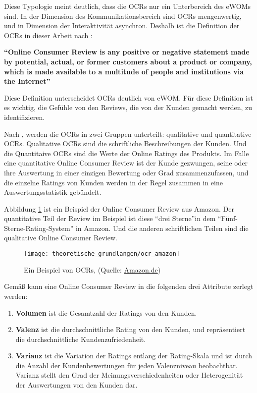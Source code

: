 Diese Typologie meint deutlich, dass die \ac{OCRs} nur ein Unterbereich des \ac{eWOM}s sind. In der Dimension des Kommunikationsbereich sind \ac{OCRs} mengenwertig, und in Dimension der Interaktivität asynchron. Deshalb ist die Definition der \ac{OCRs} in dieser Arbeit nach \citet{Hennig-Thurau2004a}:

\textbf{``Online Consumer Review is any positive or negative statement made by potential, actual, or former customers about a product or company, which is made available to a multitude of people and institutions via the Internet''}

Diese Definition unterscheidet \acl{OCRs} deutlich von \ac{eWOM}. Für diese Definition ist es wichtig, die Gefühle von den Reviews, die von der Kunden gemacht werden, zu identifizieren. 

Nach \citet{Shrihari2012}, werden die \ac{OCRs} in zwei Gruppen unterteilt: qualitative und quantitative \ac{OCRs}. Qualitative \ac{OCRs} sind die schriftliche Beschreibungen der Kunden. Und die Quantitaive \ac{OCRs} sind die Werte der Online Ratings des Produkts. Im Falle eine quantitative Online Consumer Review ist der Kunde gezwungen, seine oder ihre Auswertung in einer einzigen Bewertung oder Grad zusammenzufassen, und die einzelne Ratings von Kunden werden in der Regel zusammen in eine Auswertungsstatistik gebündelt. \citep{Kostyra2015}

Abbildung \ref{fig:beispiel_ocr} ist ein Beispiel der Online Consumer Review aus Amazon. Der quantitative Teil der Review im Beispiel ist diese ``drei Sterne''in dem ``Fünf-Sterne-Rating-System'' in Amazon. Und die anderen schriftlichen Teilen sind die qualitative Online Consumer Review.

\begin{figure}[htb]
	\begin{center}
		\texttt{[image: theoretische\_grundlangen/ocr\_amazon]}
		\caption[Ein Beispiel von OCRs]{Ein Beispiel von \ac{OCRs}, (Quelle: \href{http://www.amazon.de/}{Amazon.de})}
		\label{fig:beispiel_ocr}
	\end{center}
\end{figure}

Gemäß \citet{pradeep2010the} kann eine Online Consumer Review in die folgenden drei Attribute zerlegt werden:
\begin{enumerate}
	\item \textbf{Volumen} ist die Gesamtzahl der Ratings von den Kunden.
	\item \textbf{Valenz} ist die durchschnittliche Rating von den Kunden, und repräsentiert die durchschnittliche Kundenzufriedenheit.
	\item \textbf{Varianz} ist die Variation der Ratings entlang der Rating-Skala und ist durch die Anzahl der Kundenbewertungen für jeden Valenzniveau beobachtbar. Varianz stellt den Grad der Meinungsverschiedenheiten oder Heterogenität der Auswertungen von den Kunden dar.
\end{enumerate}
